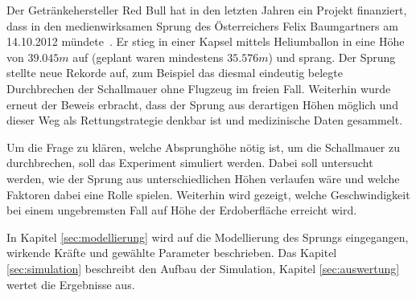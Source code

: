 Der Getränkehersteller Red Bull hat in den letzten Jahren ein Projekt finanziert, dass in den medienwirksamen Sprung des Österreichers Felix Baumgartners am 14.10.2012 mündete~\cite{rbstratos}.
Er stieg in einer Kapsel mittels Heliumballon in eine Höhe von $39.045m$ auf (geplant waren mindestens $35.576m$) und sprang.
Der Sprung stellte neue Rekorde auf, zum Beispiel das diesmal eindeutig belegte Durchbrechen der Schallmauer ohne Flugzeug im freien Fall.
Weiterhin wurde erneut der Beweis erbracht, dass der Sprung aus derartigen Höhen möglich und dieser Weg als Rettungstrategie denkbar ist und medizinische Daten gesammelt.

Um die Frage zu klären, welche Absprunghöhe nötig ist, um die Schallmauer zu durchbrechen, soll das Experiment simuliert werden.
Dabei soll untersucht werden, wie der Sprung aus unterschiedlichen Höhen verlaufen wäre und welche Faktoren dabei eine Rolle spielen.
Weiterhin wird gezeigt, welche Geschwindigkeit bei einem ungebremsten Fall auf Höhe der Erdoberfläche erreicht wird.

In Kapitel \ref{sec:modellierung} wird auf die Modellierung des Sprungs eingegangen, wirkende Kräfte und gewählte Parameter beschrieben. Das Kapitel \ref{sec:simulation} beschreibt den Aufbau der Simulation, Kapitel \ref{sec:auswertung} wertet die Ergebnisse aus.
